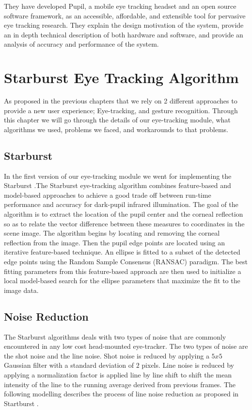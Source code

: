 \documentclass[12pt,fleqn]{book} %
\begin{document}
They have developed Pupil, a mobile eye tracking headset and an open source software framework, as an accessible, affordable, and extensible tool for pervasive eye tracking research. They explain the design motivation of the system, provide an in depth technical description of both hardware and software, and provide an analysis of accuracy and performance of the system.


\chapter{Starburst Eye Tracking Algorithm}
As proposed in the previous chapters that we rely on 2 different approaches to provide a new user experience; Eye-tracking, and gesture recognition. Through this chapter we will go through the details of our eye-tracking module, what algorithms we used, problems we faced, and workarounds to that problems.

\section{Starburst}
In the first version of our eye-tracking module we went for implementing the Starburst \cite{starburst}.The Starburst eye-tracking algorithm combines feature-based and model-based approaches to achieve a good trade off between run-time performance and accuracy for dark-pupil infrared illumination. The goal of the algorithm is to extract the location of the pupil center and the corneal reflection so as to relate the vector difference between these measures to coordinates in the scene image. The algorithm begins by locating and removing the corneal reflection from the image. Then the pupil edge points are located using an iterative feature-based technique. An ellipse is fitted to a subset of the detected edge points using the Random Sample Consensus (RANSAC) paradigm. The best fitting parameters from this feature-based approach are then used to initialize a local model-based search for the ellipse  parameters that maximize the fit to the image data.

\section{Noise Reduction}
The Starburst algorithms deals with two types of noise that are commonly encountered in any low cost head-mounted eye-tracker. The two types of noise are the shot noise and the line noise. Shot noise is reduced by applying a $5x5$ Gaussian filter with a standard deviation of $2$ pixels. Line noise is reduced by applying a normalization factor is applied line by line shift to shift the mean intensity of the line to the running average derived from previous frames. The following modelling describes the process of line noise reduction as proposed in Startburst \cite{starburst}.
\end{document}
